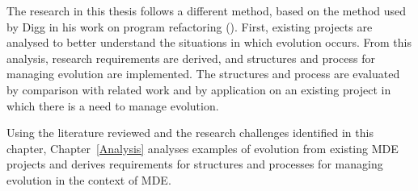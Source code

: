 The research in this thesis follows a different method, based on the method used by Digg in his work on program refactoring (\cite{dig06apis,dig06automatic,dig06detection,dig07cms}). First, existing projects are analysed to better understand the situations in which evolution occurs. From this analysis, research requirements are derived, and structures and process for managing evolution are implemented. The structures and process are evaluated by comparison with related work and by application on an existing project in which there is a need to manage evolution.

Using the literature reviewed and the research challenges identified in this chapter, Chapter~\ref{Analysis} analyses examples of evolution from existing MDE projects and derives requirements for structures and processes for managing evolution in the context of MDE. 